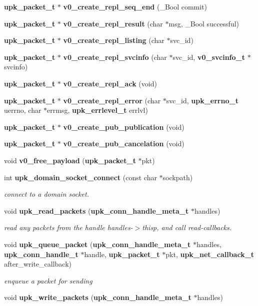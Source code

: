 \begin{DoxyCompactItemize}
\item 
{\bf upk\_\-packet\_\-t} $\ast$ {\bf v0\_\-create\_\-repl\_\-seq\_\-end} (\_\-Bool commit)
\item 
{\bf upk\_\-packet\_\-t} $\ast$ {\bf v0\_\-create\_\-repl\_\-result} (char $\ast$msg, \_\-Bool successful)
\item 
{\bf upk\_\-packet\_\-t} $\ast$ {\bf v0\_\-create\_\-repl\_\-listing} (char $\ast$svc\_\-id)
\item 
{\bf upk\_\-packet\_\-t} $\ast$ {\bf v0\_\-create\_\-repl\_\-svcinfo} (char $\ast$svc\_\-id, {\bf v0\_\-svcinfo\_\-t} $\ast$svcinfo)
\item 
{\bf upk\_\-packet\_\-t} $\ast$ {\bf v0\_\-create\_\-repl\_\-ack} (void)
\item 
{\bf upk\_\-packet\_\-t} $\ast$ {\bf v0\_\-create\_\-repl\_\-error} (char $\ast$svc\_\-id, {\bf upk\_\-errno\_\-t} uerrno, char $\ast$errmsg, {\bf upk\_\-errlevel\_\-t} errlvl)
\item 
{\bf upk\_\-packet\_\-t} $\ast$ {\bf v0\_\-create\_\-pub\_\-publication} (void)
\item 
{\bf upk\_\-packet\_\-t} $\ast$ {\bf v0\_\-create\_\-pub\_\-cancelation} (void)
\item 
void {\bf v0\_\-free\_\-payload} ({\bf upk\_\-packet\_\-t} $\ast$pkt)
\item 
int {\bf upk\_\-domain\_\-socket\_\-connect} (const char $\ast$sockpath)
\begin{DoxyCompactList}\small\item\em connect to a domain socket. \end{DoxyCompactList}\item 
void {\bf upk\_\-read\_\-packets} ({\bf upk\_\-conn\_\-handle\_\-meta\_\-t} $\ast$handles)
\begin{DoxyCompactList}\small\item\em read any packets from the handle handles-\/$>$thisp, and call read-\/callbacks. \end{DoxyCompactList}\item 
void {\bf upk\_\-queue\_\-packet} ({\bf upk\_\-conn\_\-handle\_\-meta\_\-t} $\ast$handles, {\bf upk\_\-conn\_\-handle\_\-t} $\ast$handle, {\bf upk\_\-packet\_\-t} $\ast$pkt, {\bf upk\_\-net\_\-callback\_\-t} after\_\-write\_\-callback)
\begin{DoxyCompactList}\small\item\em enqueue a packet for sending \end{DoxyCompactList}\item 
void {\bf upk\_\-write\_\-packets} ({\bf upk\_\-conn\_\-handle\_\-meta\_\-t} $\ast$handles)

\end{DoxyCompactItemize}
